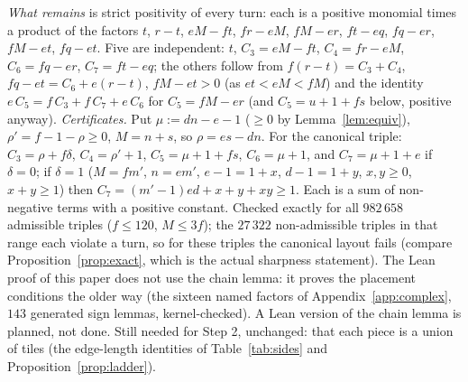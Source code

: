 \documentclass[11pt,reqno]{amsart}
\theoremstyle{plain}
\theoremstyle{definition}
\begin{document}
\emph{What remains} is strict positivity of every turn: each is a positive monomial times a product of the factors $t$, $r-t$, $eM-ft$, $fr-eM$, $fM-er$, $ft-eq$, $fq-er$, $fM-et$, $fq-et$. Five are independent: $t$, $C_3=eM-ft$, $C_4=fr-eM$, $C_6=fq-er$, $C_7=ft-eq$; the others follow from $f(r-t)=C_3+C_4$, $fq-et=C_6+e(r-t)$, $fM-et>0$ (as $et<eM<fM$) and the identity $e\,C_5=f\,C_3+f\,C_7+e\,C_6$ for $C_5=fM-er$ (and $C_5=u+1+fs$ below, positive anyway).
\emph{Certificates.} Put $\mu:=dn-e-1$ ($\ge0$ by Lemma~\ref{lem:equiv}), $\rho'=f-1-\rho\ge0$, $M=n+s$, so $\rho=es-dn$. For the canonical triple: $C_3=\rho+f\delta$, $C_4=\rho'+1$, $C_5=\mu+1+fs$, $C_6=\mu+1$, and $C_7=\mu+1+e$ if $\delta=0$; if $\delta=1$ ($M=fm'$, $n=em'$, $e-1=1+x$, $d-1=1+y$, $x,y\ge0$, $x+y\ge1$) then $C_7=(m'-1)ed+x+y+xy\ge1$. Each is a sum of non-negative terms with a positive constant. Checked exactly for all $982\,658$ admissible triples ($f\le120$, $M\le3f$); the $27\,322$ non-admissible triples in that range each violate a turn, so for these triples the canonical layout fails (compare Proposition~\ref{prop:exact}, which is the actual sharpness statement). The Lean proof of this paper does not use the chain lemma: it proves the placement conditions the older way (the sixteen named factors of Appendix~\ref{app:complex}, $143$ generated sign lemmas, kernel-checked). A Lean version of the chain lemma is planned, not done. Still needed for Step 2, unchanged: that each piece is a union of tiles (the edge-length identities of Table~\ref{tab:sides} and Proposition~\ref{prop:ladder}).
\end{document}

